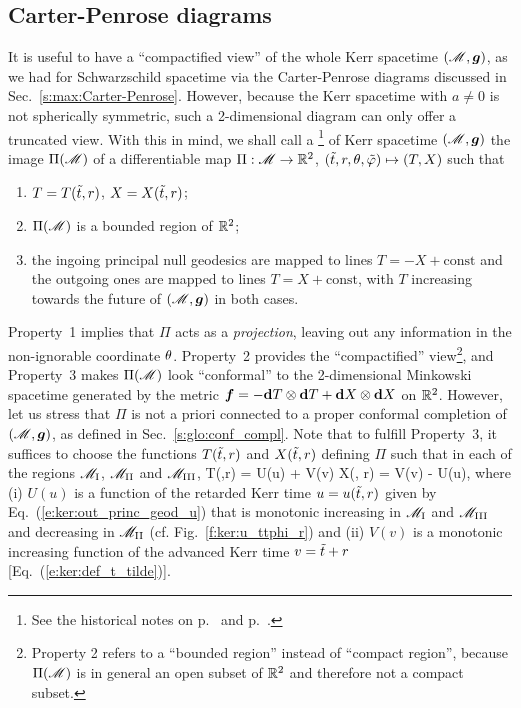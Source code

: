 \subsection{Carter-Penrose diagrams} \label{s:ker:Carter_Penrose_diag}

It is useful to have a ``compactified view'' of the whole Kerr spacetime $(\mathscr{M},\bm{g})$,
as we had for Schwarzschild spacetime via the Carter-Penrose diagrams
discussed in Sec.~\ref{s:max:Carter-Penrose}.
However, because the Kerr spacetime with $a\neq 0$ is not spherically symmetric,
such a 2-dimensional diagram can only offer a truncated view.
With this in mind, we shall call a \footnote{See the historical notes on p.~\pageref{h:max:CP-diag} and p.~\pageref{h:ker:max_ext_diag}.}
of Kerr spacetime $(\mathscr{M},\bm{g})$ the image $\Pi(\mathscr{M})$ of a differentiable map $\Pi: \mathscr{M} \to \mathbb{R}^2$,
$({\tilde t},r,\theta,{\tilde\varphi})\mapsto (T, X)$ such that
\begin{enumerate}
\item $T = T({\tilde t}, r)$, $X = X({\tilde t}, r)$;
\item $\Pi(\mathscr{M})$ is a bounded region of $\mathbb{R}^2$;
\item the ingoing principal null geodesics are mapped to lines $T = -X +\mathrm{const}$
and the outgoing ones are mapped to lines $T = X +\mathrm{const}$, with $T$ increasing
towards the future of $(\mathscr{M},\bm{g})$ in both cases.
\end{enumerate}
Property~1 implies that $\Pi$ acts as a \emph{projection}, leaving out any information
in the non-ignorable coordinate $\theta$. Property~2 provides the ``compactified''
view\footnote{Property 2 refers to a
``bounded region'' instead of ``compact region'', because $\Pi(\mathscr{M})$
is in general an open subset of $\mathbb{R}^2$ and therefore not a compact subset.},
and Property~3 makes $\Pi(\mathscr{M})$ look ``conformal'' to the 2-dimensional
Minkowski spacetime generated
by the metric $\bm{f} = -\mathbf{d} T\otimes \mathbf{d} T + \mathbf{d} X\otimes \mathbf{d} X$ on $\mathbb{R}^2$.
However, let us stress that $\Pi$
is not a priori connected to a proper conformal completion of
$(\mathscr{M},\bm{g})$, as defined in Sec.~\ref{s:glo:conf_compl}.
Note that to fulfill Property~3, it suffices to choose the functions $T({\tilde t},r)$
and $X({\tilde t},r)$ defining $\Pi$ such that in each of the regions $\mathscr{M}_{\rm I}$,
$\mathscr{M}_{\rm II}$ and $\mathscr{M}_{\rm III}$,
\be \label{e:ker:Carter_Penrose_T_X}
    T(\ti,r) = U(u) + V(v) \qand X(\ti, r) = V(v) - U(u),
\ee
where (i) $U(u)$ is a function of the retarded Kerr time $u = u({\tilde t},r)$ given by Eq.~(\ref{e:ker:out_princ_geod_u}) that is monotonic increasing in $\mathscr{M}_{\rm I}$ and $\mathscr{M}_{\rm III}$
and decreasing in $\mathscr{M}_{\rm II}$ (cf. Fig.~\ref{f:ker:u_ttphi_r})
and (ii) $V(v)$ is a monotonic increasing function of the advanced Kerr time $v = {\tilde t} + r$ [Eq.~(\ref{e:ker:def_t_tilde})].

